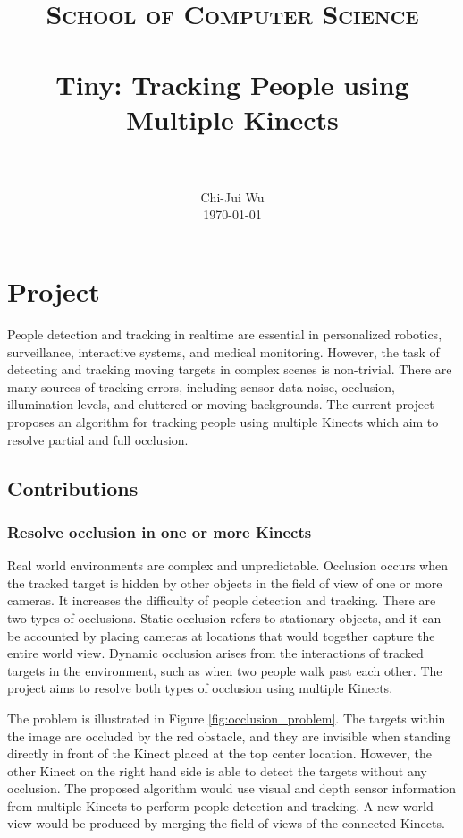 \documentclass[paper=a4, fontsize=11pt]{scrartcl}
\title{
		\vspace{-3ex}
		\usefont{OT1}{bch}{b}{n}
		\normalfont \normalsize \textsc{School of Computer Science} \\ [25pt]
		\horrule{0.5pt} \\[0.4cm]
		\huge Tiny: Tracking People using Multiple Kinects \\
		\horrule{2pt} \\[0.5cm]
		\vspace{-2ex}
}
\author{
		\normalfont 								\normalsize
        Chi-Jui Wu\\[-3pt]		\normalsize
        \today
}
\date{}
\numberwithin{equation}{section}		%
\numberwithin{figure}{section}			%
\numberwithin{table}{section}				%
\begin{document}
\maketitle

\section{Project}

People detection and tracking in realtime are essential in personalized robotics, surveillance, interactive systems, and medical monitoring. However, the task of detecting and tracking moving targets in complex scenes is non-trivial. There are many sources of tracking errors, including sensor data noise, occlusion, illumination levels, and cluttered or moving backgrounds. The current project proposes an algorithm for tracking people using multiple Kinects which aim to resolve partial and full occlusion.

\subsection{Contributions}

\subsubsection{Resolve occlusion in one or more Kinects}

Real world environments are complex and unpredictable. Occlusion occurs when the tracked target is hidden by other objects in the field of view of one or more cameras. It increases the difficulty of people detection and tracking. There are two types of occlusions. Static occlusion refers to stationary objects, and it can be accounted by placing cameras at locations that would together capture the entire world view. Dynamic occlusion arises from the interactions of tracked targets in the environment, such as when two people walk past each other. The project aims to resolve both types of occlusion using multiple Kinects. 

The problem is illustrated in Figure \ref{fig:occlusion_problem}. The targets within the image are occluded by the red obstacle, and they are invisible when standing directly in front of the Kinect placed at the top center location. However, the other Kinect on the right hand side is able to detect the targets without any occlusion. The proposed algorithm would use visual and depth sensor information from multiple Kinects to perform people detection and tracking. A new world view would be produced by merging the field of views of the connected Kinects.
\end{document}
